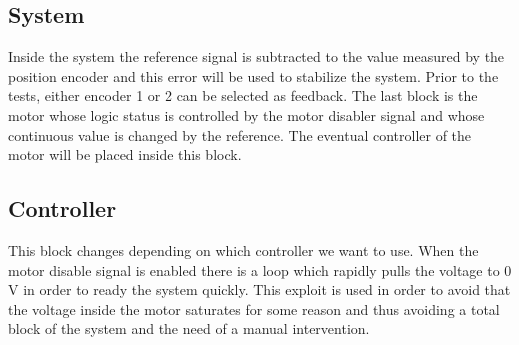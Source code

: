 \subsection{System}
Inside the system the reference signal is subtracted to the value measured by the position encoder and this error will be used to stabilize the system. Prior to the tests, either encoder 1 or 2 can be selected as feedback.
The last block is the motor whose logic status is controlled by the motor disabler signal and whose continuous value is changed by the reference.
The eventual controller of the motor will be placed inside this block.

\subsection{Controller}
This block changes depending on which controller we want to use. When the motor disable signal is enabled there is a loop which rapidly pulls the voltage to 0 V in order to ready the system quickly. This exploit is used in order to avoid that the voltage inside the motor saturates for some reason and thus avoiding a total block of the system and the need of a manual intervention.

